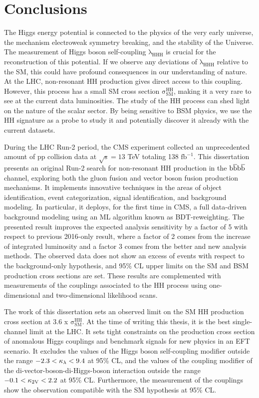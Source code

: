 \chapter{Conclusions} \label{chapter:conclusions}
The Higgs energy potential is connected to the physics of the very early universe, the mechanism electroweak symmetry breaking, and the stability of the Universe. The measurement of Higgs boson self-coupling $\mathrm{\lambda_{HHH}}$ is crucial for the reconstruction of this potential. If we observe any deviations of $\mathrm{\lambda_{HHH}}$ relative to the SM, this could have profound consequences in our understanding of nature. At the LHC, non-resonant HH production gives direct access to this coupling. However, this process has a small SM cross section $\mathrm{\sigma_{SM}^{HH}}$, making it a very rare to see at the current data luminosities. The study of the HH process can shed light on the nature of the scalar sector. By being sensitive to BSM physics, we use the HH signature as a probe to study it and potentially discover it already with the current datasets.

During the LHC Run-2 period, the CMS experiment collected an unprecedented amount of pp collision data at $\mathrm{\sqrt{s}= 13}$ TeV totaling 138 $\mathrm{fb^{-1}}$. This dissertation presents an original Run-2 search for non-resonant HH production in the $\mathrm{ b\overline{b}b\overline{b} }$ channel, exploring both the gluon fusion and vector boson fusion production mechanisms. It implements innovative techniques in the areas of object identification, event categorization, signal identification, and background modeling. In particular, it deploys, for the first time in CMS, a full data-driven background modeling using an ML algorithm known as BDT-reweighting. The presented result improves the expected analysis sensitivity by a factor of 5 with respect to previous 2016-only result, where a factor of 2 comes from the increase of integrated luminosity and a factor 3 comes from the better and new analysis methods. The observed data does not show an excess of events with respect to the background-only hypothesis, and 95\% CL upper limits on the SM and BSM production cross sections are set. These results are complemented with measurements of the couplings associated to the HH process using one-dimensional and two-dimensional likelihood scans.

The work of this dissertation sets an observed limit on the SM HH production cross section at $3.6$ x $\mathrm{\sigma_{SM}^{HH}}$. At the time of writing this thesis, it is the best single-channel limit at the LHC. It sets tight constraints on the production cross section of anomalous Higgs couplings and benchmark signals for new physics in an EFT scenario. It excludes the values of the Higgs boson self-coupling modifier outside the range $-2.3<\kappa_{\lambda}<9.4$ at 95\% CL, and the values of the coupling modifier of the di-vector-boson-di-Higgs-boson interaction outside the range $-0.1<\mathrm{\kappa_{2V} }<2.2$ at 95\% CL. Furthermore, the measurement of the couplings show the observation compatible with the SM hypothesis at 95\% CL. 

